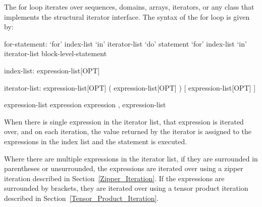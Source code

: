 The for loop iterates over sequences, domains, arrays, iterators, or
any class that implements the structural iterator interface.  The
syntax of the for loop is given by:
\begin{syntax}
for-statement:
  `for' index-list `in' iterator-list `do' statement
  `for' index-list `in' iterator-list block-level-statement

index-list:
  expression-list[OPT]

iterator-list:
  expression-list[OPT]
  ( expression-list[OPT] )
  [ expression-list[OPT] ]

expression-list
  expression
  expression , expression-list
\end{syntax}

When there is single expression in the iterator list, that expression
is iterated over, and on each iteration, the value returned by the
iterator is assigned to the expressions in the index list and the
statement is executed.

Where there are multiple expressions in the iterator list, if they are
surrounded in parentheses or unsurrounded, the expressions are
iterated over using a zipper iteration described in
Section~\ref{Zipper_Iteration}.  If the expressions are surrounded by
brackets, they are iterated over using a tensor product iteration
described in Section~\ref{Tensor_Product_Iteration}.
